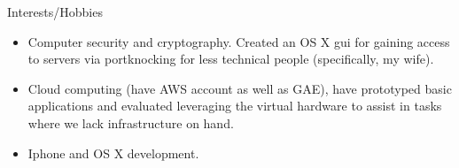 \documentclass[11pt,oneside]{article}
\newenvironment{ressection}[1]{
	\vspace{4pt}
	{\fontfamily{phv}\selectfont\Large#1}
	\begin{itemize}
	\vspace{3pt}
}{
	\end{itemize}
}
\newcommand{\resitem}[1]{
	\vspace{-4pt}
	\item \begin{flushleft} #1 \end{flushleft}
}
\begin{document}
\begin{ressection}{Interests/Hobbies}
  
  \resitem{Computer security and cryptography. Created an OS X gui for
    gaining access to servers via portknocking for less technical
    people (specifically, my wife).}

  \resitem{Cloud computing (have AWS account as well as GAE), have
    prototyped basic applications and evaluated leveraging the virtual
    hardware to assist in tasks where we lack infrastructure on hand.}

  \resitem{Iphone and OS X development.}
  
\end{ressection}
\end{document}
